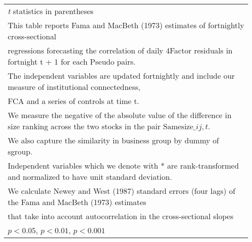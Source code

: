 {\begin{tabular}{l*{7}{c}}
\hline\hline
\multicolumn{8}{l}{\footnotesize \textit{t} statistics in parentheses}\\
\multicolumn{8}{l}{\footnotesize This table reports Fama and MacBeth (1973) estimates of fortnightly cross-sectional}\\
\multicolumn{8}{l}{\footnotesize  regressions forecasting the correlation of daily 4Factor residuals in fortnight t + 1 for each Pseudo pairs.}\\
\multicolumn{8}{l}{\footnotesize The independent variables are updated fortnightly and include our measure of institutional connectedness,}\\
\multicolumn{8}{l}{\footnotesize  FCA and a series of controls at time t.}\\
\multicolumn{8}{l}{\footnotesize We measure the negative of the absolute value of the difference in size ranking across the two stocks in the pair $ \text{Samesize}\_{ij,t} $.}\\
\multicolumn{8}{l}{\footnotesize We also capture the similarity in business group by dummy of sgroup.}\\
\multicolumn{8}{l}{\footnotesize Independent variables which  we denote with * are rank-transformed and normalized to have unit standard deviation.}\\
\multicolumn{8}{l}{\footnotesize  We calculate Newey and West (1987) standard errors (four lags) of the Fama and MacBeth (1973) estimates }\\
\multicolumn{8}{l}{\footnotesize  that take into account autocorrelation in the cross-sectional slopes}\\
\multicolumn{8}{l}{\footnotesize \sym{*} \(p<0.05\), \sym{**} \(p<0.01\), \sym{***} \(p<0.001\)}\\
\end{tabular}
}
